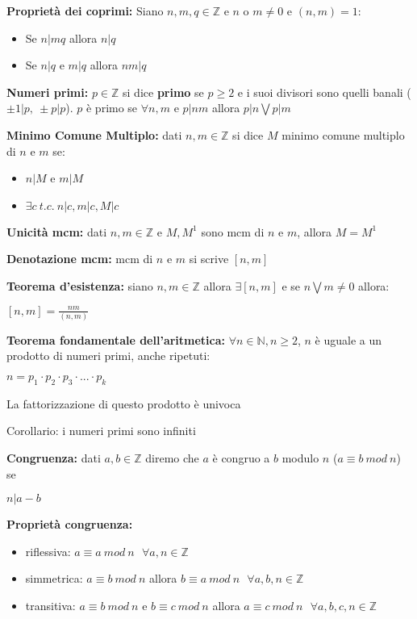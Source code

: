 \documentclass[11pt, letterpaper]{article}
\begin{document}
\textbf{Proprietà dei coprimi:} Siano $n,m,q\in\mathbb{Z}$ e $n$ o $m\neq 0$ e $(n,m)=1$:
\begin{itemize}
    \item Se $n|mq$ allora $n|q$
    \item Se $n|q$ e $m|q$ allora $nm|q$
\end{itemize} 

\textbf{Numeri primi:} $p\in\mathbb{Z}$ si dice \textbf{primo} se $p\geq 2$ e i suoi divisori sono quelli banali 
($\pm 1|p,\ \pm p|p$). $p$ è primo se $\forall n,m$ e $p|nm$ allora $p|n\bigvee p|m$

\textbf{Minimo Comune Multiplo:} dati $n,m\in\mathbb{Z}$ si dice $M$ minimo comune multiplo di $n$ e $m$ se:
\begin{itemize}
    \item $n|M$ e $m|M$
    \item $\exists c\ t.c.\ n|c, m|c, M|c$
\end{itemize}

\textbf{Unicità mcm:} dati $n,m\in\mathbb{Z}$ e $M,M^{1}$ sono mcm di $n$ e $m$, allora $M=M^{1}$

\textbf{Denotazione mcm:} mcm di $n$ e  $m$ si scrive $[n,m]$

\textbf{Teorema d'esistenza:} siano $n,m\in\mathbb{Z}$ allora $\exists [n,m]$ e se $n\bigvee m\neq 0$ allora:
\begin{center}
    $[n,m] = \frac{nm}{(n,m)}$
\end{center}

\textbf{Teorema fondamentale dell'aritmetica:} $\forall n\in\mathbb{N},n\geq 2$, $n$ è uguale a un prodotto di numeri
primi, anche ripetuti:
\begin{center}
    $n=p_{1}\cdot p_{2}\cdot p_{3}\cdot ... \cdot p_{k}$
\end{center}
La fattorizzazione di questo prodotto è univoca

Corollario: i numeri primi sono infiniti

\textbf{Congruenza:} dati $a,b\in\mathbb{Z}$ diremo che $a$ è  congruo a $b$ modulo $n$ ($a\equiv b\ mod\ n$) se
\begin{center}
    $n|a-b$
\end{center} 

\textbf{Proprietà congruenza:} 
\begin{itemize}
    \item riflessiva: $a\equiv a\ mod\ n\ \ \ \forall a,n\in\mathbb{Z}$
    \item simmetrica: $a\equiv b\ mod\ n$ allora $b\equiv a\ mod\ n\ \ \ \forall a,b,n\in\mathbb{Z}$
    \item transitiva: $a\equiv b\ mod\ n$ e $b\equiv c\ mod\ n$ allora $a\equiv c\ mod\ n\ \ \ 
    \forall a,b,c,n\in\mathbb{Z}$
\end{itemize}
\end{document}
